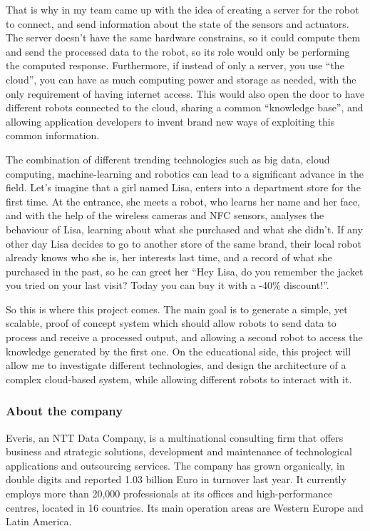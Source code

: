 \documentclass[]{article}
\begin{document}
That is why in my team came up with the idea of creating a server for
the robot to connect, and send information about the state of the
sensors and actuators. The server doesn't have the same hardware
constrains, so it could compute them and send the processed data to the
robot, so its role would only be performing the computed response.
Furthermore, if instead of only a server, you use ``the cloud'', you can
have as much computing power and storage as needed, with the only
requirement of having internet access. This would also open the door to
have different robots connected to the cloud, sharing a common
``knowledge base'', and allowing application developers to invent brand
new ways of exploiting this common information.

The combination of different trending technologies such as big data,
cloud computing, machine-learning and robotics can lead to a significant
advance in the field. Let's imagine that a girl named Lisa, enters into
a department store for the first time. At the entrance, she meets a
robot, who learns her name and her face, and with the help of the
wireless cameras and NFC sensors, analyses the behaviour of Lisa,
learning about what she purchased and what she didn't. If any other day
Lisa decides to go to another store of the same brand, their local robot
already knows who she is, her interests last time, and a record of what
she purchased in the past, so he can greet her ``Hey Lisa, do you
remember the jacket you tried on your last visit? Today you can buy it
with a -40\% discount!''.

So this is where this project comes. The main goal is to generate a
simple, yet scalable, proof of concept system which should allow robots
to send data to process and receive a processed output, and allowing a
second robot to access the knowledge generated by the first one. On the
educational side, this project will allow me to investigate different
technologies, and design the architecture of a complex cloud-based
system, while allowing different robots to interact with it.

\hypertarget{about-the-company}{%
\subsubsection{About the company}\label{about-the-company}}

Everis, an NTT Data Company, is a multinational consulting firm that
offers business and strategic solutions, development and maintenance of
technological applications and outsourcing services. The company has
grown organically, in double digits and reported 1.03 billion Euro in
turnover last year. It currently employs more than 20,000 professionals
at its offices and high-performance centres, located in 16 countries.
Its main operation areas are Western Europe and Latin America.
\end{document}
